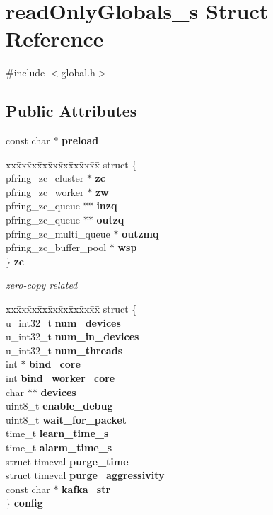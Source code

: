 \section{read\+Only\+Globals\+\_\+s Struct Reference}
\label{structread_only_globals__s}


{\ttfamily \#include $<$global.\+h$>$}

\subsection*{Public Attributes}
\begin{DoxyCompactItemize}
\item 
const char $\ast$ {\bf preload}
\item 
\begin{tabbing}
xx\=xx\=xx\=xx\=xx\=xx\=xx\=xx\=xx\=\kill
struct \{\\
\>pfring\_zc\_cluster $\ast$ {\bf zc}\\
\>pfring\_zc\_worker $\ast$ {\bf zw}\\
\>pfring\_zc\_queue $\ast$$\ast$ {\bf inzq}\\
\>pfring\_zc\_queue $\ast$$\ast$ {\bf outzq}\\
\>pfring\_zc\_multi\_queue $\ast$ {\bf outzmq}\\
\>pfring\_zc\_buffer\_pool $\ast$ {\bf wsp}\\
\} {\bf zc}\\

\end{tabbing}\begin{DoxyCompactList}\small\item\em zero-\/copy related \end{DoxyCompactList}\item 
\begin{tabbing}
xx\=xx\=xx\=xx\=xx\=xx\=xx\=xx\=xx\=\kill
struct \{\\
\>u\_int32\_t {\bf num\_devices}\\
\>u\_int32\_t {\bf num\_in\_devices}\\
\>u\_int32\_t {\bf num\_threads}\\
\>int $\ast$ {\bf bind\_core}\\
\>int {\bf bind\_worker\_core}\\
\>char $\ast$$\ast$ {\bf devices}\\
\>uint8\_t {\bf enable\_debug}\\
\>uint8\_t {\bf wait\_for\_packet}\\
\>time\_t {\bf learn\_time\_s}\\
\>time\_t {\bf alarm\_time\_s}\\
\>struct timeval {\bf purge\_time}\\
\>struct timeval {\bf purge\_aggressivity}\\
\>const char $\ast$ {\bf kafka\_str}\\
\} {\bf config}\\


\end{tabbing}
\end{DoxyCompactItemize}
